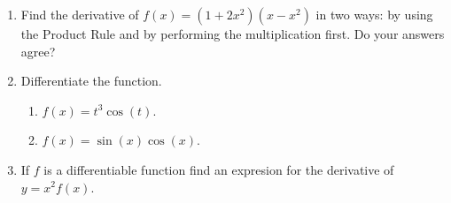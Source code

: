 


\begin{enumerate}
	\item	Find the derivative of $f(x) = (1+2x^2)(x-x^2)$ in two ways: by using the Product Rule and 
			by performing the multiplication first. Do your answers agree?
		\vfill

	\item	Differentiate the function.
		\begin{enumerate}
			\item	$f(x) = t^3 \cos(t)$.
		\vfill
			\item	$f(x) = \sin(x) \cos(x)$.
		\vfill
		\end{enumerate}

	\item	If $f$ is a differentiable function find an expresion for the derivative of $y = x^2 f(x)$.
	\vfill

\end{enumerate}


